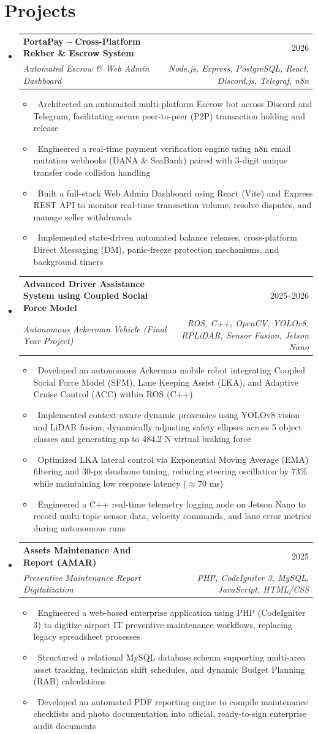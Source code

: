 \documentclass[letterpaper,10pt]{article}
\makeatletter
\newcommand{\resumeItem}[1]{\item\small{#1}}
\newcommand{\resumeSubheading}[4]{
\vspace{-1pt}\item
  \begin{tabular*}{0.97\textwidth}[t]{l@{\extracolsep{\fill}}r}
    \textbf{#1} & #2 \\
    \textit{#3} & \textit{#4} \\
  \end{tabular*}\vspace{-7pt}
}
\newcommand{\resumeSubHeadingList}{\begin{itemize}[leftmargin=0.15in, label={}]}
\newcommand{\resumeSubHeadingListEnd}{\end{itemize}}
\makeatother
\begin{document}
\section{Projects}
\resumeSubHeadingList
    \resumeSubheading
      {PortaPay -- Cross-Platform Rekber \& Escrow System}{2026} 
      {Automated Escrow \& Web Admin Dashboard}{Node.js, Express, PostgreSQL, React, Discord.js, Telegraf, n8n}
      \resumeSubHeadingList
          \resumeItem{\textbullet\ Architected an automated multi-platform Escrow bot across Discord and Telegram, facilitating secure peer-to-peer (P2P) transaction holding and release}
          \resumeItem{\textbullet\ Engineered a real-time payment verification engine using n8n email mutation webhooks (DANA \& SeaBank) paired with 3-digit unique transfer code collision handling}
          \resumeItem{\textbullet\ Built a full-stack Web Admin Dashboard using React (Vite) and Express REST API to monitor real-time transaction volume, resolve disputes, and manage seller withdrawals}
          \resumeItem{\textbullet\ Implemented state-driven automated balance releases, cross-platform Direct Messaging (DM), panic-freeze protection mechanisms, and background timers}
      \resumeSubHeadingListEnd
  \resumeSubheading
      {Advanced Driver Assistance System using Coupled Social Force Model}{2025--2026}
      {Autonomous Ackerman Vehicle (Final Year Project)}{ROS, C++, OpenCV, YOLOv8, RPLiDAR, Sensor Fusion, Jetson Nano}
      \resumeSubHeadingList
          \resumeItem{\textbullet\ Developed an autonomous Ackerman mobile robot integrating Coupled Social Force Model (SFM), Lane Keeping Assist (LKA), and Adaptive Cruise Control (ACC) within ROS (C++)}
          \resumeItem{\textbullet\ Implemented context-aware dynamic proxemics using YOLOv8 vision and LiDAR fusion, dynamically adjusting safety ellipses across 5 object classes and generating up to 484.2 N virtual braking force}
          \resumeItem{\textbullet\ Optimized LKA lateral control via Exponential Moving Average (EMA) filtering and 30-px deadzone tuning, reducing steering oscillation by 73\% while maintaining low response latency ($\approx$70 ms)}
          \resumeItem{\textbullet\ Engineered a C++ real-time telemetry logging node on Jetson Nano to record multi-topic sensor data, velocity commands, and lane error metrics during autonomous runs}
      \resumeSubHeadingListEnd
    \resumeSubheading
      {Assets Maintenance And Report (AMAR)}{2025} 
      {Preventive Maintenance Report Digitalization}{PHP, CodeIgniter 3, MySQL, JavaScript, HTML/CSS}
      \resumeSubHeadingList
          \resumeItem{\textbullet\ Engineered a web-based enterprise application using PHP (CodeIgniter 3) to digitize airport IT preventive maintenance workflows, replacing legacy spreadsheet processes}
          \resumeItem{\textbullet\ Structured a relational MySQL database schema supporting multi-area asset tracking, technician shift schedules, and dynamic Budget Planning (RAB) calculations}
          \resumeItem{\textbullet\ Developed an automated PDF reporting engine to compile maintenance checklists and photo documentation into official, ready-to-sign enterprise audit documents}
      \resumeSubHeadingListEnd
\resumeSubHeadingListEnd
\end{document}
